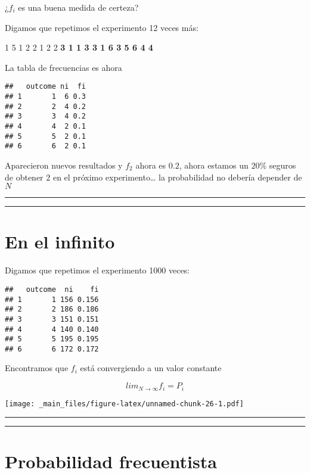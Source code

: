 \documentclass[
]{book}
\begin{document}
¿\(f_i\) es una buena medida de certeza?

Digamos que repetimos el experimento 12 veces más:

1 5 1 2 2 1 2 2 \textbf{3 1 1 3 3 1 6 3 5 6 4 4}

La tabla de frecuencias es ahora

\begin{verbatim}
##   outcome ni  fi
## 1       1  6 0.3
## 2       2  4 0.2
## 3       3  4 0.2
## 4       4  2 0.1
## 5       5  2 0.1
## 6       6  2 0.1
\end{verbatim}

Aparecieron nuevos resultados y \(f_2\) ahora es \(0.2\), ahora estamos un \(20\%\) seguros de obtener \(2\) en el próximo experimento\ldots{} la probabilidad no debería depender de \(N\)

\begin{center}\rule{0.5\linewidth}{0.5pt}\end{center}

\begin{center}\rule{0.5\linewidth}{0.5pt}\end{center}

\hypertarget{en-el-infinito}{%
\section{En el infinito}\label{en-el-infinito}}

Digamos que repetimos el experimento 1000 veces:

\begin{verbatim}
##   outcome  ni    fi
## 1       1 156 0.156
## 2       2 186 0.186
## 3       3 151 0.151
## 4       4 140 0.140
## 5       5 195 0.195
## 6       6 172 0.172
\end{verbatim}

Encontramos que \(f_i\) está convergiendo a un valor constante

\[lim_{N\rightarrow \infty} f_i = P_i\]

\texttt{[image: \_main\_files/figure-latex/unnamed-chunk-26-1.pdf]}

\begin{center}\rule{0.5\linewidth}{0.5pt}\end{center}

\begin{center}\rule{0.5\linewidth}{0.5pt}\end{center}

\hypertarget{probabilidad-frecuentista}{%
\section{Probabilidad frecuentista}\label{probabilidad-frecuentista}}
\end{document}
